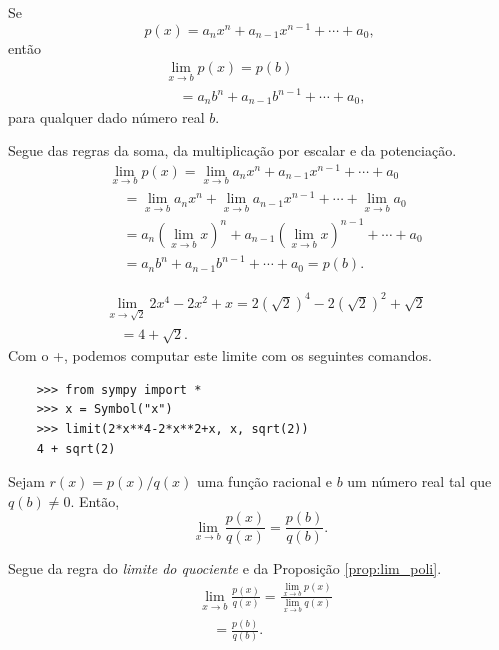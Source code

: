 \begin{prop}\label{prop:lim_poli}
  Se
  \begin{equation}
    p(x) = a_nx^n + a_{n-1}x^{n-1} + \cdots + a_0,
  \end{equation}
  então
  \begin{align}
    & \lim_{x\to b} p(x) = p(b) \\
    & \text{}\quad = a_nb^n + a_{n-1}b^{n-1} + \cdots + a_0,
  \end{align}
  para qualquer dado número real $b$.
\end{prop}
\begin{dem}
  Segue das regras da soma, da multiplicação por escalar e da potenciação.
  \begin{align}
    & \lim_{x\to b} p(x) = \lim_{x\to b} a_nx^n + a_{n-1}x^{n-1} + \cdots + a_0 \\
    & \text{}\quad = \lim_{x\to b} a_nx^n + \lim_{x\to b} a_{n-1}x^{n-1} + \cdots + \lim_{x\to b} a_0 \\
    & \text{}\quad = a_n\left(\lim_{x\to b} x\right)^n + a_{n-1}\left(\lim_{x\to b} x\right)^{n-1} + \cdots + a_0 \\
    & \text{}\quad = a_nb^n + a_{n-1}b^{n-1} + \cdots + a_0 = p(b).
  \end{align}
\end{dem}

\begin{ex}
  \begin{align}
    & \lim_{x\to \sqrt{2}} 2x^4 - 2x^2 + x = 2(\sqrt{2})^4 - 2(\sqrt{2})^2 + \sqrt{2} \\
    & \text{}\quad = 4+\sqrt{2}.
  \end{align}
  \ifispython
  Com o {\python}+{\sympy}, podemos computar este limite com os seguintes comandos.
  \begin{lstlisting}
    >>> from sympy import *
    >>> x = Symbol("x")
    >>> limit(2*x**4-2*x**2+x, x, sqrt(2))
    4 + sqrt(2)
  \end{lstlisting}
  \fi
\end{ex}

\begin{prop}
  Sejam $r(x) = p(x)/q(x)$ uma função racional e $b$ um número real tal que $q(b)\neq 0$. Então,
  \begin{equation}
    \lim_{x\to b} \frac{p(x)}{q(x)} = \frac{p(b)}{q(b)}.
  \end{equation}
\end{prop}
\begin{dem}
  Segue da regra do \emph{limite do quociente} e da Proposição \ref{prop:lim_poli}.
  \begin{align}
    & \lim_{x\to b} \frac{p(x)}{q(x)} = \frac{\displaystyle\lim_{x\to b} p(x)}{\displaystyle\lim_{x\to b} q(x)} \\
    & \text{}\quad = \frac{p(b)}{q(b)}.
  \end{align}
\end{dem}

